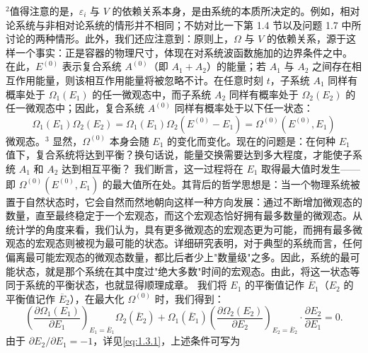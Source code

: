 \(^{2}\)值得注意的是，\(\varepsilon_{i}\) 与 \(V\) 的依赖关系本身，是由系统的本质所决定的。例如，相对论系统与非相对论系统的情形并不相同；不妨对比一下第 1.4 节以及问题 1.7 中所讨论的两种情形。此外，我们还应注意到：原则上，\(\Omega\) 与 \(V\) 的依赖关系，源于这样一个事实：正是容器的物理尺寸，体现在对系统波函数施加的边界条件之中。
在此，\(E^{(0)}\) 表示复合系统 \(A^{(0)}\)（即 \(A_{1}+A_{2}\)）的能量；若 \(A_{1}\) 与 \(A_{2}\) 之间存在相互作用能量，则该相互作用能量将被忽略不计。在任意时刻 \(t\)，子系统 \(A_{1}\) 同样有概率处于 \(\Omega_{1}(E_{1})\) 的任一微观态中，而子系统 \(A_{2}\) 同样有概率处于 \(\Omega_{2}(E_{2})\) 的任一微观态中；因此，复合系统 \(A^{(0)}\) 同样有概率处于以下任一状态：
\begin{equation}\tag{1.2.4}\label{eq:1.2.4}
\Omega _ { 1 } ( E _ { 1 } ) \Omega _ { 2 } ( E _ { 2 } ) = \Omega _ { 1 } ( E _ { 1 } ) \Omega _ { 2 } ( E ^{( 0 )} - E _ { 1 } ) = \Omega ^{( 0 )} ( E ^{( 0 )} , E _ { 1 } )
\end{equation}
微观态。\(^{3}\) 显然，\(\Omega^{(0)}\) 本身会随 \(E_{1}\) 的变化而变化。现在的问题是：在何种 \(E_{1}\) 值下，复合系统将达到平衡？换句话说，能量交换需要达到多大程度，才能使子系统 \(A_{1}\) 和 \(A_{2}\) 达到相互平衡？
我们断言，这一过程将在 \(E_{1}\) 取得最大值时发生——即 \(\Omega^{(0)}(E^{(0)},E_{1})\) 的最大值所在处。其背后的哲学思想是：当一个物理系统被置于自然状态时，它会自然而然地朝向这样一种方向发展：通过不断增加微观态的数量，直至最终稳定于一个宏观态，而这个宏观态恰好拥有最多数量的微观态。从统计学的角度来看，我们认为，具有更多微观态的宏观态更为可能，而拥有最多微观态的宏观态则被视为最可能的状态。详细研究表明，对于典型的系统而言，任何偏离最可能宏观态的微观态数量，都比后者少上"数量级"之多。因此，系统的最可能状态，就是那个系统在其中度过"绝大多数"时间的宏观态。由此，将这一状态等同于系统的平衡状态，也就显得顺理成章。
我们将 \(E_{1}\) 的平衡值记作 \(\overline{E}_{1}\)（\(E_{2}\) 的平衡值记作 \(\overline{E}_{2}\)），在最大化 \(\Omega^{(0)}\) 时，我们得到：
\begin{equation}\tag{1.2.5}\label{eq:1.2.5}
\left( \frac { \partial \Omega _ { 1 } ( E _ { 1 } ) } { \partial E _ { 1 } } \right) _ { E _ { 1 } = \overline { { E } } _ { 1 } } \Omega _ { 2 } ( \overline { { E } } _ { 2 } ) + \Omega _ { 1 } ( \overline { { E } } _ { 1 } ) \left( \frac { \partial \Omega _ { 2 } ( E _ { 2 } ) } { \partial E _ { 2 } } \right) _ { E _ { 2 } = \overline { { E } } _ { 2 } } \cdot \frac { \partial E _ { 2 } } { \partial E _ { 1 } } = 0 .
\end{equation}
由于 \(\partial E_{2}/\partial E_{1}=-1\)，详见\autoref{eq:1.3.1}，上述条件可写为
